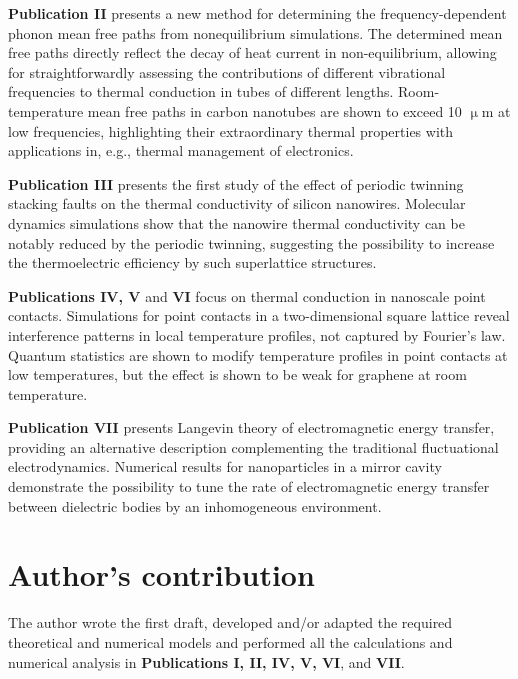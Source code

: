 \documentclass[dissertation,draft*]{aaltoseries}
\begin{document}
\vspace{1cm}
\noindent
\textbf{Publication II} presents a new method for determining the frequency-dependent phonon mean free paths from nonequilibrium simulations. The determined mean free paths directly reflect the decay of heat current in non-equilibrium, allowing for straightforwardly assessing the contributions of different vibrational frequencies to thermal conduction in tubes of different lengths. Room-temperature mean free paths in carbon nanotubes are shown to exceed 10 $\upmu$m at low frequencies, highlighting their extraordinary thermal properties with applications in, e.g., thermal management of electronics. 

\vspace{1cm}
\noindent
\textbf{Publication III} presents the first study of the effect of periodic twinning stacking faults on the thermal conductivity of silicon nanowires. Molecular dynamics simulations show that the nanowire thermal conductivity can be notably reduced by the periodic twinning, suggesting the possibility to increase the thermoelectric efficiency by such superlattice structures.

\vspace{1cm}
\noindent
\textbf{Publications IV, V} and \textbf{VI} focus on thermal conduction in nanoscale point contacts. Simulations for point contacts in a two-dimensional square lattice reveal interference patterns in local temperature profiles, not captured by Fourier's law. Quantum statistics are shown to modify temperature profiles in point contacts at low temperatures, but the effect is shown to be weak for graphene at room temperature.

\vspace{1cm}
\noindent
\textbf{Publication VII} presents Langevin theory of electromagnetic energy transfer, providing an alternative description complementing the traditional fluctuational electrodynamics. Numerical results for nanoparticles in a mirror cavity demonstrate the possibility to tune the rate of electromagnetic energy transfer between dielectric bodies by an inhomogeneous environment.

\chapter*{Author's contribution}
The author wrote the first draft, developed and/or adapted the required theoretical and numerical models and performed all the calculations and numerical analysis in \textbf{Publications I, II, IV, V, VI}, and \textbf{VII}.
\end{document}
